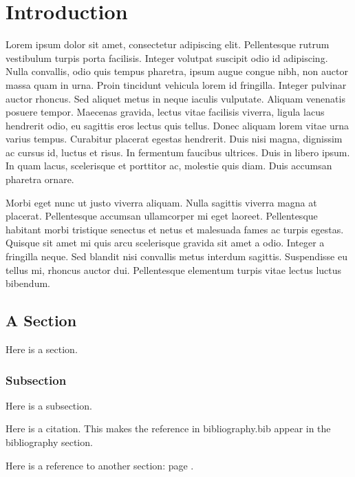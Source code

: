 \chapter{Introduction}
\label{chap:Introduction}

Lorem ipsum dolor sit amet, consectetur adipiscing elit. Pellentesque
rutrum vestibulum turpis porta facilisis. Integer volutpat suscipit
odio id adipiscing. Nulla convallis, odio quis tempus pharetra, ipsum
augue congue nibh, non auctor massa quam in urna. Proin tincidunt
vehicula lorem id fringilla. Integer pulvinar auctor rhoncus. Sed
aliquet metus in neque iaculis vulputate. Aliquam venenatis posuere
tempor. Maecenas gravida, lectus vitae facilisis viverra, ligula lacus
hendrerit odio, eu sagittis eros lectus quis tellus. Donec aliquam
lorem vitae urna varius tempus. Curabitur placerat egestas
hendrerit. Duis nisi magna, dignissim ac cursus id, luctus et
risus. In fermentum faucibus ultrices. Duis in libero ipsum. In quam
lacus, scelerisque et porttitor ac, molestie quis diam. Duis accumsan
pharetra ornare.

Morbi eget nunc ut justo viverra aliquam. Nulla sagittis viverra magna
at placerat. Pellentesque accumsan ullamcorper mi eget
laoreet. Pellentesque habitant morbi tristique senectus et netus et
malesuada fames ac turpis egestas. Quisque sit amet mi quis arcu
scelerisque gravida sit amet a odio. Integer a fringilla neque. Sed
blandit nisi convallis metus interdum sagittis. Suspendisse eu tellus
mi, rhoncus auctor dui. Pellentesque elementum turpis vitae lectus
luctus bibendum.



\section{A Section}
\label{sec:test}

Here is a section. 

\subsection{Subsection}
\label{subsec:s1}

Here is a subsection. 

Here \cite{2476800320070101} is a citation. This makes the reference
in bibliography.bib appear in the bibliography section. 

Here is a reference to another section: page \pageref{sec:another}.
